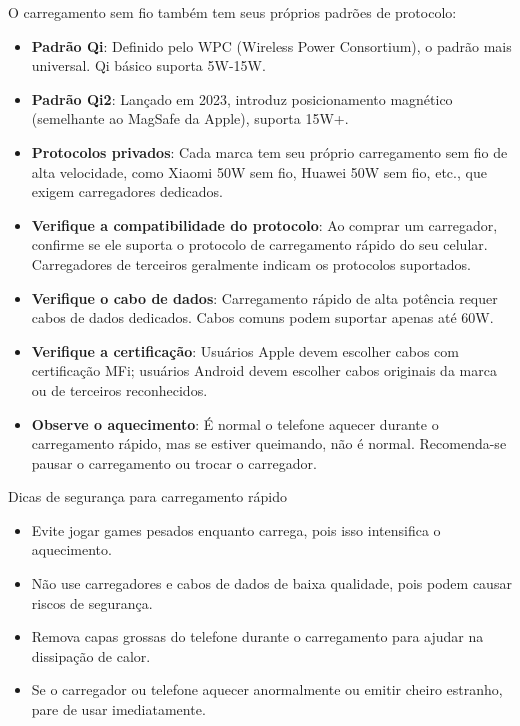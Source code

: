
O carregamento sem fio também tem seus próprios padrões de protocolo:

\begin{itemize}
  \item \textbf{Padrão Qi}: Definido pelo WPC (Wireless Power Consortium), o padrão mais universal. Qi básico suporta 5W-15W.
  \item \textbf{Padrão Qi2}: Lançado em 2023, introduz posicionamento magnético (semelhante ao MagSafe da Apple), suporta 15W+.
  \item \textbf{Protocolos privados}: Cada marca tem seu próprio carregamento sem fio de alta velocidade, como Xiaomi 50W sem fio, Huawei 50W sem fio, etc., que exigem carregadores dedicados.
\end{itemize}


\begin{itemize}
  \item \textbf{Verifique a compatibilidade do protocolo}: Ao comprar um carregador, confirme se ele suporta o protocolo de carregamento rápido do seu celular. Carregadores de terceiros geralmente indicam os protocolos suportados.
  \item \textbf{Verifique o cabo de dados}: Carregamento rápido de alta potência requer cabos de dados dedicados. Cabos comuns podem suportar apenas até 60W.
  \item \textbf{Verifique a certificação}: Usuários Apple devem escolher cabos com certificação MFi; usuários Android devem escolher cabos originais da marca ou de terceiros reconhecidos.
  \item \textbf{Observe o aquecimento}: É normal o telefone aquecer durante o carregamento rápido, mas se estiver queimando, não é normal. Recomenda-se pausar o carregamento ou trocar o carregador.
\end{itemize}

\begin{tcbwarn}{Dicas de segurança para carregamento rápido}
\begin{itemize}
  \item Evite jogar games pesados enquanto carrega, pois isso intensifica o aquecimento.
  \item Não use carregadores e cabos de dados de baixa qualidade, pois podem causar riscos de segurança.
  \item Remova capas grossas do telefone durante o carregamento para ajudar na dissipação de calor.
  \item Se o carregador ou telefone aquecer anormalmente ou emitir cheiro estranho, pare de usar imediatamente.
\end{itemize}

\end{tcbwarn}

